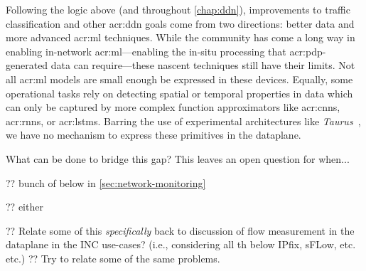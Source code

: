 Following the logic above (and throughout \cref{chap:ddn}), improvements to traffic classification and other \gls{acr:ddn} goals come from two directions: better data and more advanced \gls{acr:ml} techniques.
While the community has come a long way in enabling in-network \gls{acr:ml}---enabling the in-situ processing that \gls{acr:pdp}-generated data can require---these nascent techniques still have their limits.
Not all \gls{acr:ml} models are small enough be expressed in these devices.
Equally, some operational tasks rely on detecting spatial or temporal properties in data which can only be captured by more complex function approximators like \glspl{acr:cnn}, \glspl{acr:rnn}, or \glspl{acr:lstm}.
Barring the use of experimental architectures like \emph{Taurus}~\parencite{DBLP:conf/asplos/SwamyR0GO22}, we have no mechanism to express these primitives in the dataplane.

What can be done to bridge this gap?
This leaves an open question for when...

?? bunch of below in \cref{sec:network-monitoring}

?? either 

?? Relate some of this \emph{specifically} back to discussion of flow measurement in the dataplane in the INC use-cases? (i.e., considering all th below IPfix, sFLow, etc. etc.)
?? Try to relate some of the same problems.


